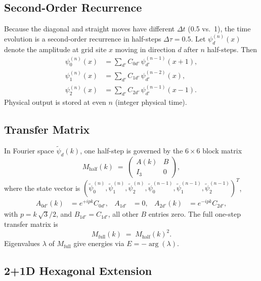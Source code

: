 \documentclass[twocolumn,showpacs,preprintnumbers,amsmath,amssymb]{revtex4-2}
\begin{document}
\subsection{Second-Order Recurrence}

Because the diagonal and straight moves have different $\Delta t$ (0.5 vs.\ 1),
the time evolution is a second-order recurrence in half-steps
$\Delta\tau = 0.5$.
Let $\psi_d^{(n)}(x)$ denote the amplitude at grid site $x$ moving in
direction $d$ after $n$ half-steps.  Then
\begin{align}
  \psi_0^{(n)}(x) &= \sum_{d'} C_{0d'}\, \psi_{d'}^{(n-1)}(x+1),
  \label{eq:rec_left}\\
  \psi_1^{(n)}(x) &= \sum_{d'} C_{1d'}\, \psi_{d'}^{(n-2)}(x),
  \label{eq:rec_straight}\\
  \psi_2^{(n)}(x) &= \sum_{d'} C_{2d'}\, \psi_{d'}^{(n-1)}(x-1).
  \label{eq:rec_right}
\end{align}
Physical output is stored at even $n$ (integer physical time).

\subsection{Transfer Matrix}

In Fourier space $\tilde\psi_d(k)$, one half-step is governed by the
$6\times 6$ block matrix
\begin{equation}
  M_{\mathrm{half}}(k) \;=\;
  \begin{pmatrix} A(k) & B \\ I_3 & 0 \end{pmatrix},
  \label{eq:TM_half}
\end{equation}
where the state vector is
$(\tilde\psi_0^{(n)}, \tilde\psi_1^{(n)}, \tilde\psi_2^{(n)},
  \tilde\psi_0^{(n-1)}, \tilde\psi_1^{(n-1)}, \tilde\psi_2^{(n-1)})^T$,
\begin{align}
  A_{0d'}(k) &= e^{+ipk} C_{0d'}, &
  A_{1d'} &= 0, &
  A_{2d'}(k) &= e^{-ipk} C_{2d'},
\end{align}
with $p = k\,\sqrt{3}/2$, and $B_{1d'} = C_{1d'}$, all other
$B$ entries zero.
The full one-step transfer matrix is
\begin{equation}
  M_{\mathrm{full}}(k) \;=\; M_{\mathrm{half}}(k)^2.
  \label{eq:TM_full}
\end{equation}
Eigenvalues $\lambda$ of $M_{\mathrm{full}}$ give energies via
$E = -\arg(\lambda)$.

\subsection{2+1D Hexagonal Extension}
\end{document}
